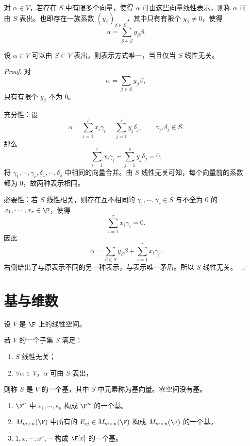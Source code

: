 \begin{definition}
	对 $\alpha\in V$，若存在 $S$ 中有限多个向量，使得 $\alpha$ 可由这些向量线性表示，则称 $\alpha$ 可由 $S$ 表出。也即存在一族系数 $(y_\beta)_{\beta\in S}$，其中只有有限个 $y_\beta\neq0$，使得
	\[
	\alpha=\sum_{\beta\in S}y_\beta\beta.
	\]
\end{definition}

\begin{proposition}
	设 $\alpha\in V$ 可以由 $S\subset V$ 表出，则表示方式唯一，当且仅当 $S$ 线性无关。
\end{proposition}

\begin{proof}
	对
	\[
	\alpha=\sum_{\beta\in S}y_\beta\beta,
	\]
	只有有限个 $y_\beta$ 不为 $0$。
	
	充分性：设
	\[
	\alpha=\sum_{i=1}^{r}x_i\gamma_i
	=\sum_{j=1}^{s}y_j\delta_j,
	\qquad
	\gamma_i,\delta_j\in S.
	\]
	那么
	\[
	\sum_{i=1}^{r}x_i\gamma_i-
	\sum_{j=1}^{s}y_j\delta_j=0.
	\]
	将 $\gamma_1,\cdots,\gamma_r,\delta_1,\cdots,\delta_s$ 中相同的向量合并。由 $S$ 线性无关可知，每个向量前的系数都为 $0$，故两种表示相同。
	
	必要性：若 $S$ 线性相关，则存在互不相同的 $\gamma_1,\cdots,\gamma_r\in S$ 与不全为 $0$ 的 $x_1,\cdots,x_r\in\F$，使得
	\[
	\sum_{i=1}^{r}x_i\gamma_i=0.
	\]
	因此
	\[
	\alpha=
	\sum_{\beta\in S}y_\beta\beta
	+
	\sum_{i=1}^{r}x_i\gamma_i.
	\]
	右侧给出了与原表示不同的另一种表示，与表示唯一矛盾。所以 $S$ 线性无关。
\end{proof}

\section{基与维数}

设 $V$ 是 $\F$ 上的线性空间。

\begin{definition}
	若 $V$ 的一个子集 $S$ 满足：
	\begin{enumerate}
		\item $S$ 线性无关；
		\item $\forall \alpha\in V$，$\alpha$ 可由 $S$ 表出，
	\end{enumerate}
	则称 $S$ 是 $V$ 的一个基，其中 $S$ 中元素称为基向量。零空间没有基。
\end{definition}

\begin{example}
	\begin{enumerate}
		\item $\F^n$ 中 $\varepsilon_1,\cdots,\varepsilon_n$ 构成 $\F^n$ 的一个基。
		\item $M_{m\times n}(\F)$ 中所有的 $E_{ij}\in M_{m\times n}(\F)$ 构成 $M_{m\times n}(\F)$ 的一个基。
		\item $1,x,\cdots,x^n,\cdots$ 构成 $\F[x]$ 的一个基。
	\end{enumerate}
\end{example}

